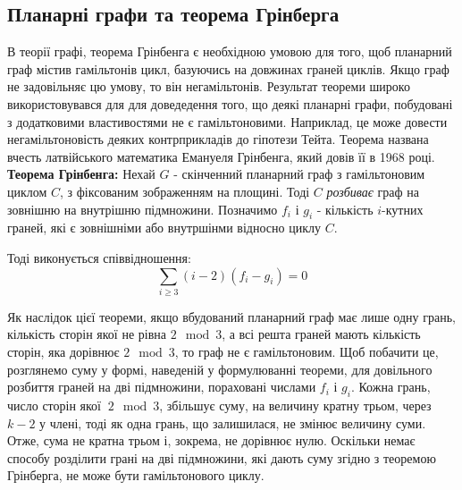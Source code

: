 \documentclass[14pt]{article}
\begin{document}
\begin{spacing}{1.175}
        \subsection{\normalfont Планарні графи та теорема Грінберга}
            \qquad В теорії графі, теорема Грінбенга є необхідною умовою для того, щоб планарний граф містив гамільтонів цикл, базуючись на довжинах граней циклів. Якщо граф не задовільняє цю умову, то він негамільтонів. Результат теореми широко використовувався для для доведедення того, що деякі планарні графи, побудовані з додатковими властивостями не є гамільтоновими. Наприклад, це може довести негамільтоновість деяких контрприкладів до гіпотези Тейта. Теорема названа вчесть латвійського математика Емануеля Грінбенга, який довів її в 1968 році.
            \\

            \textbf{Теорема Грінбенга:} Нехай \(G\) - скінченний планарний граф з гамільтоновим циклом \(C\), з фіксованим зображенням на площині. Тоді \(C\) \textit{розбиває} граф на зовнішню на внутрішню підмножини. Позначимо \(f_i\) і \(g_i\) - кількість \(i\)-кутних граней, які є зовнішніми або внутршінми відносно циклу \(C\). 
            
            Тоді виконується співвідношення: $$ \sum_{i\ge3} (i - 2)(f_i - g_i) = 0 $$

            Як наслідок цієї теореми, якщо вбудований планарний граф має лише одну грань, кількість сторін якої не рівна \( 2 \mod 3\), а всі решта граней мають кількість сторін, яка дорівнює \( 2 \mod 3\), то граф не є гамільтоновим. Щоб побачити це, розглянемо суму у формі, наведеній у формулюванні теореми, для довільного розбиття граней на дві підмножини, пораховані числами \(f_i\) і \(g_i\). Кожна грань, число сторін якої \(\ 2 \mod 3\), збільшує суму, на величину кратну трьом, через \(k - 2\) у члені, тоді як одна грань, що залишилася, не змінює величину суми. Отже, сума не кратна трьом і, зокрема, не дорівнює нулю. Оскільки немає способу розділити грані на дві підмножини, які дають суму згідно з теоремою Грінберга, не може бути гамільтонового циклу.


\end{spacing}
\end{document}
